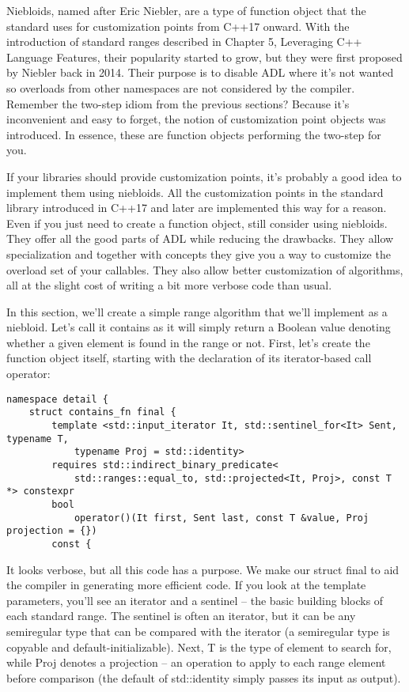 
Niebloids, named after Eric Niebler, are a type of function object that the standard uses for customization points from C++17 onward. With the introduction of standard ranges described in Chapter 5, Leveraging C++ Language Features, their popularity started to grow, but they were first proposed by Niebler back in 2014. Their purpose is to disable ADL where it's not wanted so overloads from other namespaces are not considered by the compiler. Remember the two-step idiom from the previous sections? Because it's inconvenient and easy to forget, the notion of customization point objects was introduced. In essence, these are function objects performing the two-step for you.

If your libraries should provide customization points, it's probably a good idea to implement them using niebloids. All the customization points in the standard library introduced in C++17 and later are implemented this way for a reason. Even if you just need to create a function object, still consider using niebloids. They offer all the good parts of ADL while reducing the drawbacks. They allow specialization and together with concepts they give you a way to customize the overload set of your callables. They also allow better customization of algorithms, all at the slight cost of writing a bit more verbose code than usual.

In this section, we'll create a simple range algorithm that we'll implement as a niebloid. Let's call it contains as it will simply return a Boolean value denoting whether a given element is found in the range or not. First, let's create the function object itself, starting with the declaration of its iterator-based call operator:

\begin{lstlisting}[style=styleCXX]
namespace detail {
	struct contains_fn final {
		template <std::input_iterator It, std::sentinel_for<It> Sent, typename T,
			typename Proj = std::identity>
		requires std::indirect_binary_predicate<
			std::ranges::equal_to, std::projected<It, Proj>, const T *> constexpr
		bool
			operator()(It first, Sent last, const T &value, Proj projection = {})
		const {
\end{lstlisting}

It looks verbose, but all this code has a purpose. We make our struct final to aid the compiler in generating more efficient code. If you look at the template parameters, you'll see an iterator and a sentinel – the basic building blocks of each standard range. The sentinel is often an iterator, but it can be any semiregular type that can be compared with the iterator (a semiregular type is copyable and default-initializable). Next, T is the type of element to search for, while Proj denotes a projection – an operation to apply to each range element before comparison (the default of std::identity simply passes its input as output).

